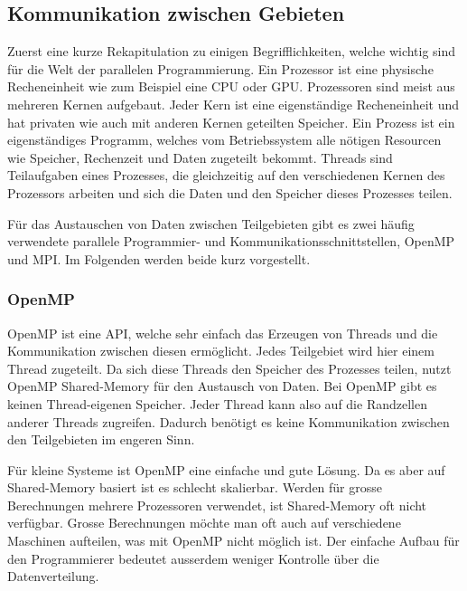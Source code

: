 %
%
%
%
\subsection{Kommunikation zwischen Gebieten
\label{parallelisierung:sub:Interprozess}}
Zuerst eine kurze Rekapitulation zu einigen Begrifflichkeiten, welche wichtig sind für die Welt der parallelen Programmierung.
Ein Prozessor ist eine physische Recheneinheit wie zum Beispiel eine CPU oder GPU.
%
%
Prozessoren sind meist aus mehreren Kernen aufgebaut.
Jeder Kern ist eine eigenständige Recheneinheit und hat privaten wie auch mit anderen Kernen geteilten Speicher.
%
%
Ein Prozess ist ein eigenständiges Programm, welches vom Betriebssystem alle nötigen Resourcen wie Speicher, Rechenzeit und Daten zugeteilt bekommt.
%
Threads sind Teilaufgaben eines Prozesses, die gleichzeitig auf den verschiedenen Kernen des Prozessors arbeiten und sich die Daten und den Speicher dieses Prozesses teilen.
%

Für das Austauschen von Daten zwischen Teilgebieten gibt es zwei häufig verwendete parallele Programmier- und Kommunikationsschnittstellen, OpenMP und MPI.
%
%
Im Folgenden werden beide kurz vorgestellt.

\subsubsection{OpenMP}
OpenMP ist eine API, welche sehr einfach das Erzeugen von Threads und die Kommunikation zwischen diesen ermöglicht.
Jedes Teilgebiet wird hier einem Thread zugeteilt. 
Da sich diese Threads den Speicher des Prozesses teilen, nutzt OpenMP Shared-Memory für den Austausch von Daten.
Bei OpenMP gibt es keinen Thread-eigenen Speicher.
Jeder Thread kann also auf die Randzellen anderer Threads zugreifen.
Dadurch benötigt es keine Kommunikation zwischen den Teilgebieten im engeren Sinn.

Für kleine Systeme ist OpenMP eine einfache und gute Lösung.
Da es aber auf Shared-Memory basiert ist es schlecht skalierbar.
Werden für grosse Berechnungen mehrere Prozessoren verwendet, ist Shared-Memory oft nicht verfügbar.
Grosse Berechnungen möchte man oft auch auf verschiedene Maschinen aufteilen, was mit OpenMP nicht möglich ist.
Der einfache Aufbau für den Programmierer bedeutet ausserdem weniger Kontrolle über die Datenverteilung.

